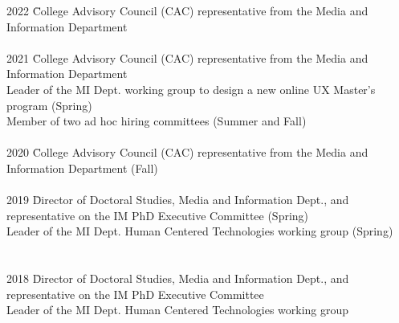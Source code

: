 \documentclass[9pt]{extarticle}
\begin{document}
\begin{tabbing}
2022 \hspace{0.3in}\= College Advisory Council (CAC) representative from the Media and \\ 
\> \hspace{0.5cm} Information Department \\\\

2021 \hspace{0.3in}\= College Advisory Council (CAC) representative from the Media and \\ 
\> \hspace{0.5cm} Information Department \\
\> Leader of the MI Dept. working group to design a new online UX Master's \\
\> \hspace{0.5cm} program (Spring) \\
\> Member of two ad hoc hiring committees (Summer and Fall) \\\\

2020 \hspace{0.3in}\= College Advisory Council (CAC) representative from the Media and \\ 
\> \hspace{0.5cm} Information Department (Fall) \\\\

2019 \hspace{0.3in}\= Director of Doctoral Studies, Media and Information Dept., and \\
\> \hspace{0.5cm} representative on the IM PhD Executive Committee (Spring) \\
\> Leader of the MI Dept. Human Centered Technologies working group (Spring) \\\\\\ 

2018 \hspace{0.3in}\= Director of Doctoral Studies, Media and Information Dept., and \\
\> \hspace{0.5cm} representative on the IM PhD Executive Committee \\
\> Leader of the MI Dept. Human Centered Technologies working group \\\\


\end{tabbing}
\end{document}
